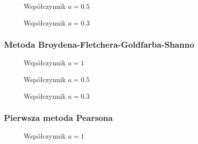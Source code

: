 \documentclass[a4paper, 10pt]{article}
\begin{document}
			
			    \begin{figure}[H]
			        \centering
			        \def \svgwidth{0.75\columnwidth}
			        
			        \caption{Współczynnik $a=0.5$}
			    \end{figure}\noindent
			
			
			    \begin{figure}[H]
			        \centering
			        \def \svgwidth{0.75\columnwidth}
			        
			        \caption{Współczynnik $a=0.3$}
			    \end{figure}\noindent
		
			\subsubsection{Metoda Broydena-Fletchera-Goldfarba-Shanno}
			    \begin{figure}[H]
			        \centering
			        \def \svgwidth{0.75\columnwidth}
			        
			        \caption{Współczynnik $a=1$}
			    \end{figure}\noindent
			
			
			    \begin{figure}[H]
			        \centering
			        \def \svgwidth{0.75\columnwidth}
			        
			        \caption{Współczynnik $a=0.5$}
			    \end{figure}\noindent
			
			
			    \begin{figure}[H]
			        \centering
			        \def \svgwidth{0.75\columnwidth}
			        
			        \caption{Współczynnik $a=0.3$}
			    \end{figure}\noindent
		
			\subsubsection{Pierwsza metoda Pearsona}
			    \begin{figure}[H]
			        \centering
			        \def \svgwidth{0.75\columnwidth}
			        
			        \caption{Współczynnik $a=1$}
			    \end{figure}\noindent
			
\end{document}
